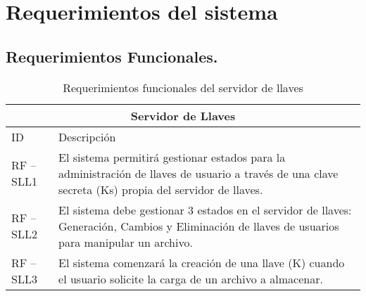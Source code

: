 \chapter{Requerimientos del sistema }

\section{Requerimientos Funcionales. }

\begin{table}[htb]
\centering
\begin{tabular}{| p{2.5cm} |  p{13.5cm} |}
\hline
\multicolumn{2}{|c|}{Servidor de Llaves} \\ \hline
ID & Descripción \\
\hline \hline
RF – SLL1 & El sistema permitirá gestionar estados para la administración de llaves de usuario a través de una clave secreta (Ks) propia del servidor de llaves. \\ \hline
RF – SLL2 & El sistema debe gestionar 3 estados en el servidor de llaves: Generación, Cambios y Eliminación de llaves de usuarios para manipular un archivo. \\ \hline
RF – SLL3 & El sistema comenzará la creación de una llave (K) cuando el usuario solicite la carga de un archivo a almacenar. \\ \hline
\end{tabular}
\caption{Requerimientos funcionales del servidor de llaves}
\label{Servidor de Llaves }
\end{table}